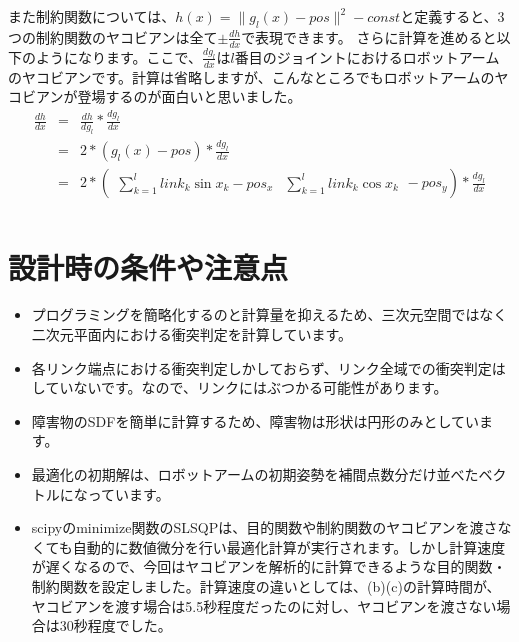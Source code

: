 \clearpage
また制約関数については、$h(x) = \|g_{l}(x) - pos\|^2 - const$と定義すると、3つの制約関数のヤコビアンは全て$\displaystyle \pm \frac{dh}{dx}$で表現できます。
さらに計算を進めると以下のようになります。ここで、$\displaystyle \frac{dg_{l}}{dx}$は$l$番目のジョイントにおけるロボットアームのヤコビアンです。計算は省略しますが、こんなところでもロボットアームのヤコビアンが登場するのが面白いと思いました。
\begin{eqnarray*}
  \frac{dh}{dx} &=& \frac{dh}{dg_{l}} * \frac{dg_{l}}{dx} \\
                &=& 2 * (g_{l}(x) - pos) * \frac{dg_{l}}{dx} \\
                &=& 2 * \left( \begin{array}{cc} \sum_{k=1}^{l} link_k\sin{x_k} - pos_x & \sum_{k=1}^{l} link_k\cos{x_k} \end{array} - pos_y \right) * \frac{dg_{l}}{dx} \\
\end{eqnarray*}

\section{設計時の条件や注意点}
\begin{itemize}
  \item プログラミングを簡略化するのと計算量を抑えるため、三次元空間ではなく二次元平面内における衝突判定を計算しています。
  \item 各リンク端点における衝突判定しかしておらず、リンク全域での衝突判定はしていないです。なので、リンクにはぶつかる可能性があります。
  \item 障害物のSDFを簡単に計算するため、障害物は形状は円形のみとしています。
  \item 最適化の初期解は、ロボットアームの初期姿勢を補間点数分だけ並べたベクトルになっています。
  \item scipyのminimize関数のSLSQPは、目的関数や制約関数のヤコビアンを渡さなくても自動的に数値微分を行い最適化計算が実行されます。しかし計算速度が遅くなるので、今回はヤコビアンを解析的に計算できるような目的関数・制約関数を設定しました。計算速度の違いとしては、(b)(c)の計算時間が、ヤコビアンを渡す場合は5.5秒程度だったのに対し、ヤコビアンを渡さない場合は30秒程度でした。
\end{itemize}
